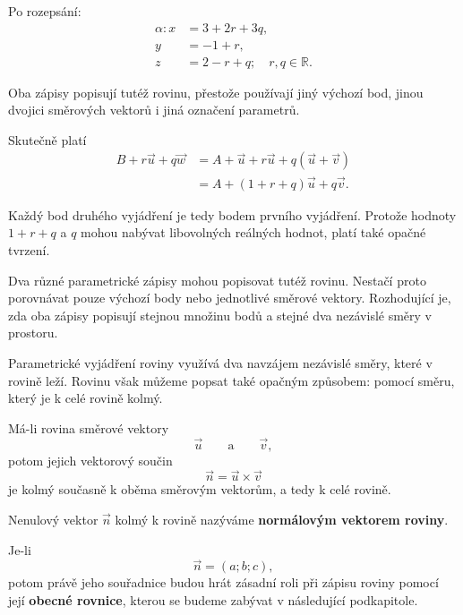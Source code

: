 Po rozepsání:
\[
    \begin{aligned}
        \alpha: x&=3+2r+3q,\\
        y&=-1+r,\\
        z&=2-r+q; \quad r,q\in\mathbb{R}.
    \end{aligned}
\]

Oba zápisy popisují tutéž rovinu, přestože používají jiný výchozí bod,
jinou dvojici směrových vektorů i jiná označení parametrů.

Skutečně platí
\begin{align*}
    B+r\vec{u}+q\vec{w}
    &=
    A+\vec{u}+r\vec{u}+q(\vec{u}+\vec{v})\\
    &=
    A+(1+r+q)\vec{u}+q\vec{v}.
\end{align*}

Každý bod druhého vyjádření je tedy bodem prvního vyjádření. Protože
hodnoty $1+r+q$ a $q$ mohou nabývat libovolných reálných hodnot, platí
také opačné tvrzení.

\begin{remark}
    Dva různé parametrické zápisy mohou popisovat tutéž rovinu.
    Nestačí proto porovnávat pouze výchozí body nebo jednotlivé
    směrové vektory. Rozhodující je, zda oba zápisy popisují stejnou
    množinu bodů a stejné dva nezávislé směry v prostoru.
\end{remark}



Parametrické vyjádření roviny využívá dva navzájem nezávislé směry,
které v rovině leží. Rovinu však můžeme popsat také opačným způsobem:
pomocí směru, který je k celé rovině kolmý.

Má-li rovina směrové vektory
\[
    \vec{u}
    \qquad\text{a}\qquad
    \vec{v},
\]
potom jejich vektorový součin
\[
    \vec{n}
    =
    \vec{u}\times\vec{v}
\]
je kolmý současně k oběma směrovým vektorům, a tedy k celé rovině.

\begin{definition}
    Nenulový vektor $\vec{n}$ kolmý k rovině nazýváme
    \textbf{normálovým vektorem roviny}.
\end{definition}

Je-li
\[
    \vec{n}=(a;b;c),
\]
potom právě jeho souřadnice budou hrát zásadní roli při zápisu roviny
pomocí její \textbf{obecné rovnice}, kterou se budeme zabývat
v následující podkapitole.